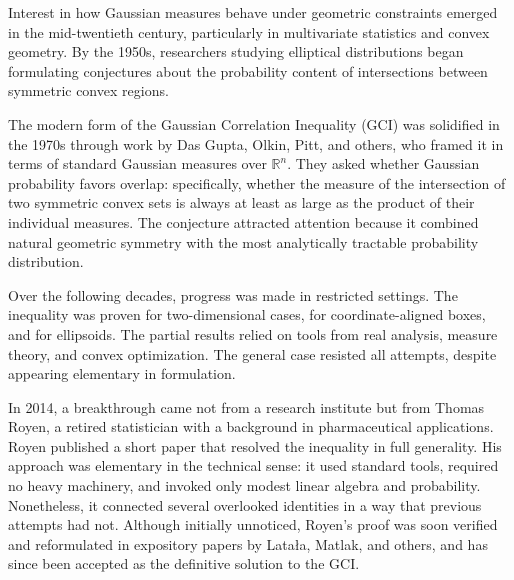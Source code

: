 \begin{historical}
Interest in how Gaussian measures behave under geometric constraints emerged in the mid-twentieth century, particularly in multivariate statistics and convex geometry. By the 1950s, researchers studying elliptical distributions began formulating conjectures about the probability content of intersections between symmetric convex regions.

The modern form of the Gaussian Correlation Inequality (GCI) was solidified in the 1970s through work by Das Gupta, Olkin, Pitt, and others, who framed it in terms of standard Gaussian measures over \(\mathbb{R}^n\). They asked whether Gaussian probability favors overlap: specifically, whether the measure of the intersection of two symmetric convex sets is always at least as large as the product of their individual measures. The conjecture attracted attention because it combined natural geometric symmetry with the most analytically tractable probability distribution.

Over the following decades, progress was made in restricted settings. The inequality was proven for two-dimensional cases, for coordinate-aligned boxes, and for ellipsoids. The partial results relied on tools from real analysis, measure theory, and convex optimization. The general case resisted all attempts, despite appearing elementary in formulation.

In 2014, a breakthrough came not from a research institute but from Thomas Royen, a retired statistician with a background in pharmaceutical applications. Royen published a short paper that resolved the inequality in full generality. His approach was elementary in the technical sense: it used standard tools, required no heavy machinery, and invoked only modest linear algebra and probability. Nonetheless, it connected several overlooked identities in a way that previous attempts had not. Although initially unnoticed, Royen's proof was soon verified and reformulated in expository papers by Latała, Matlak, and others, and has since been accepted as the definitive solution to the GCI.
\end{historical}
